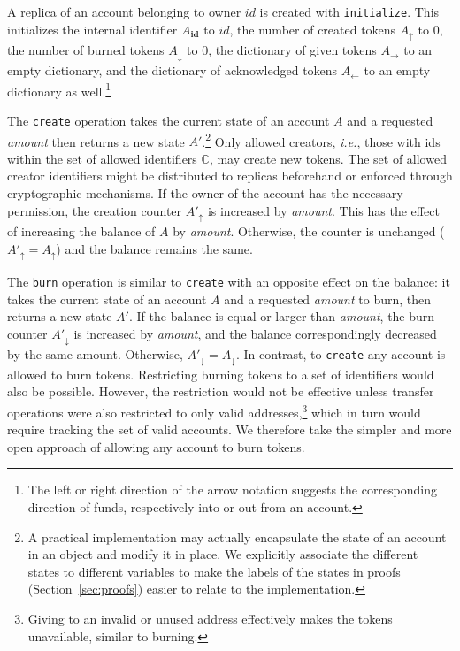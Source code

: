 \documentclass[9pt, oneside]{article}   	%
\begin{document}
A replica of an account belonging to owner $id$ is created with \texttt{initialize}. This initializes the internal identifier $A_{\textbf{id}}$ to $id$, the number of created tokens $A_\uparrow$ to $0$, the number of burned tokens $A_\downarrow$ to $0$, the dictionary of given tokens $A_\rightarrow$ to an empty dictionary, and the dictionary of acknowledged tokens $A_\leftarrow$ to an empty dictionary as well.\footnote{The left or right direction of the arrow notation suggests the corresponding direction of funds, respectively into or out from an account.}

The \texttt{create} operation takes the current state of an account $A$ and a requested \textit{amount} then returns a new state $A'$.\footnote{A practical implementation may actually encapsulate the state of an account in an object and modify it in place. We explicitly associate the different states to different variables to make the labels of the states in proofs (Section~\ref{sec:proofs}) easier to relate to the implementation.} Only allowed creators, \textit{i.e.}, those with ids within the set of allowed identifiers $\mathds{C}$, may create new tokens. The set of allowed creator identifiers might be distributed to replicas beforehand or enforced through cryptographic mechanisms. If the owner of the account has the necessary permission, the creation counter $A'_\uparrow$ is increased by \textit{amount}. This has the effect of increasing the balance of $A$ by \textit{amount}. Otherwise, the counter is unchanged ($A'_\uparrow=A_\uparrow$) and the balance remains the same.

The \texttt{burn} operation is similar to \texttt{create} with an opposite effect on the balance: it takes the current state of an account $A$ and a requested \textit{amount} to burn, then returns a new state $A'$. If the balance is equal or larger than \textit{amount}, the burn counter $A'_\downarrow$ is increased by \textit{amount}, and the balance correspondingly decreased by the same amount. Otherwise, $A'_\downarrow = A_\downarrow$. In contrast, to \texttt{create} any account is allowed to burn tokens. Restricting burning tokens to a set of identifiers would also be possible. However, the restriction would not be effective unless transfer operations were also restricted to only valid addresses,\footnote{Giving to an invalid or unused address effectively makes the tokens unavailable, similar to burning.} which in turn would require tracking the set of valid accounts. We therefore take the simpler and more open approach of allowing any account to burn tokens. 
\end{document}
